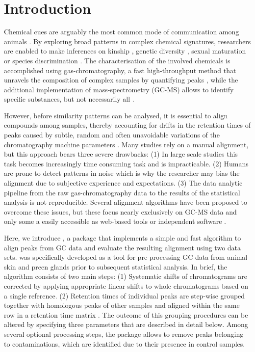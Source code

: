 \section{Introduction}
Chemical cues are arguably the most common mode of communication among animals \citep{Wyatt.2014}. By exploring broad  patterns in complex chemical signatures, researchers are enabled to make inferences on kinship \citep{Krause.2012, Stoffel.2015}, genetic diversity \citep{Charpentier.2010, Leclaire.2012}, sexual maturation \citep{Caspers.2011} or species discrimination \citep{Meulemeester.2011}. The characterisation of the involved chemicals is accomplished using gas-chromatography, a fast high-throughput method that unravels the composition of complex samples by quantifying peaks \citep{McNair.2011}, while the additional implementation of mass-spectrometry (GC-MS) allows to identify specific substances, but not necessarily all \citep{Caspers.2011}. \par
However, before similarity patterns can be analysed, it is essential to align compounds among samples, thereby accounting for drifts in the retention times of peaks caused by subtle, random and often unavoidable variations of the chromatography machine parameters \citep{Pierce.2005}. Many studies rely on a manual alignment, but this approach bears three severe drawbacks: (1) In large scale studies this task becomes increasingly time consuming task and is impracticable. (2) Humans are prone to detect patterns in noise which is why the researcher may bias the alignment due to subjective experience and expectations. (3) The data analytic pipeline from the raw gas-chromatography data to the results of the statistical analysis is not reproducible. 
Several alignment algorithms have been proposed to overcome these issues, but these focus nearly exclusively on GC-MS data \citep{Pierce.2005, Robinson.2007,Jiang.2013} and only some a easily accessible as web-based tools \citep{Hoffmann.2009, Wang.2010} or independent software \citep{Dellicour.2013}.  \par
Here, we introduce , a package that implements a simple and fast algorithm to align peaks from GC data and evaluate the resulting alignment using two data sets.  was specifically developed as a tool for pre-processing GC data from animal skin and preen glands prior to subsequent statistical analysis. In brief, the algorithm consists of two main steps: (1) Systematic shifts of chromatograms are corrected by applying appropriate linear shifts to whole chromatograms based on a single reference. (2) Retention times of individual peaks are step-wise grouped together with homologous peaks of other samples and aligned within the same row in a retention time matrix . The outcome of this grouping procedures can be altered by specifying three parameters that are described in detail below. Among several optional processing steps, the package allows to remove peaks belonging to contaminations, which are identified due to their presence in control samples. 
